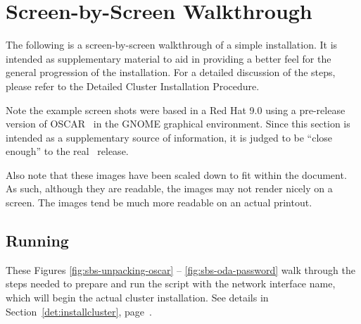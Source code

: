 %
% 
%
%
%


\newpage

\section{Screen-by-Screen Walkthrough}
\label{app:screen-by-screen}

The following is a screen-by-screen walkthrough of a simple installation.
It is intended as supplementary material to aid in providing a better feel
for the general progression of the installation.  For a detailed discussion
of the steps, please refer to the Detailed Cluster Installation Procedure. 

Note the example screen shots were based in a Red Hat 9.0 using a
pre-release version of OSCAR \oscarversion\ in the GNOME graphical
environment.  Since this section is intended as a supplementary source
of information, it is judged to be ``close enough'' to the real
\oscarversion\ release.  

Also note that these images have been scaled down to fit within the
document.  As such, although they are readable, the images may not
render nicely on a screen.  The images tend be much more readable on
an actual printout.



\subsection{Running }


These Figures \ref{fig:sbs-unpacking-oscar} -- \ref{fig:sbs-oda-password}
walk through the steps needed to prepare and run the 
script with the network interface name, which will begin the actual cluster
installation.  See details in Section~\ref{det:installcluster},
page~\pageref{det:installcluster}.

